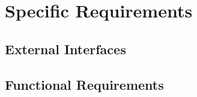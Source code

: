 \section{Specific Requirements}

\subsection{External Interfaces}
% 

\subsection{Functional Requirements}



